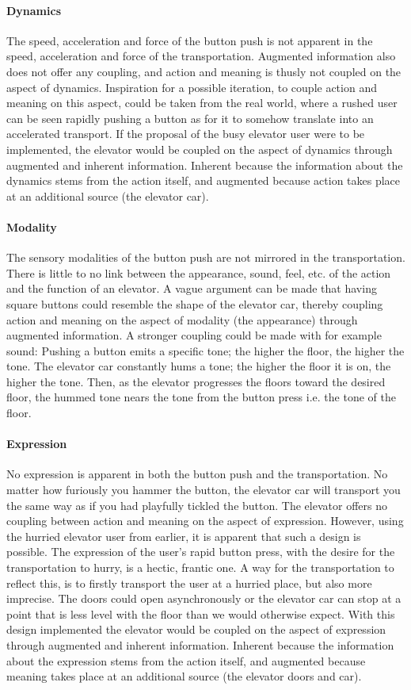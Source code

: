 \paragraph{Dynamics} The speed, acceleration and force of the button push is not apparent in the speed, acceleration and force of the transportation. Augmented information also does not offer any coupling, and action and meaning is thusly not coupled on the aspect of dynamics. Inspiration for a possible iteration, to couple action and meaning on this aspect, could be taken from the real world, where a rushed user can be seen rapidly pushing a button as for it to somehow translate into an accelerated transport. If the proposal of the busy elevator user were to be implemented, the elevator would be coupled on the aspect of dynamics through augmented and inherent information. Inherent because the information about the dynamics stems from the action itself, and augmented because action takes place at an additional source (the elevator car).
\paragraph{Modality} The sensory modalities of the button push are not mirrored in the transportation. There is little to no link between the appearance, sound, feel, etc. of the action and the function of an elevator. A vague argument can be made that having square buttons could resemble the shape of the elevator car, thereby coupling action and meaning on the aspect of modality (the appearance) through augmented information. A stronger coupling could be made with for example sound: Pushing a button emits a specific tone; the higher the floor, the higher the tone. The elevator car constantly hums a tone; the higher the floor it is on, the higher the tone. Then, as the elevator progresses the floors toward the desired floor, the hummed tone nears the tone from the button press i.e. the tone of the floor.
\paragraph{Expression} No expression is apparent in both the button push and the transportation. No matter how furiously you hammer the button, the elevator car will transport you the same way as if you had playfully tickled the button. The elevator offers no coupling between action and meaning on the aspect of expression. However, using the hurried elevator user from earlier, it is apparent that such a design is possible. The expression of the user's rapid button press, with the desire for the transportation to hurry, is a hectic, frantic one. A way for the transportation to reflect this, is to firstly transport the user at a hurried place, but also more imprecise. The doors could open asynchronously or the elevator car can stop at a point that is less level with the floor than we would otherwise expect. With this design implemented the elevator would be coupled on the aspect of expression through augmented and inherent information. Inherent because the information about the expression stems from the action itself, and augmented because meaning takes place at an additional source (the elevator doors and car). \\

